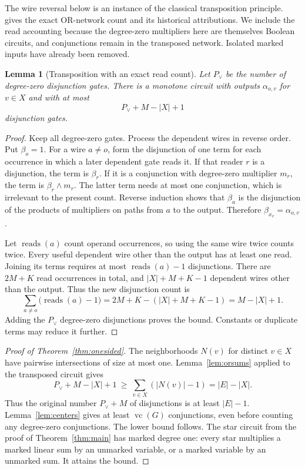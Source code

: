 \documentclass[11pt]{article}
\newcommand{\vc}{\operatorname{vc}}
\newtheorem{lemma}[theorem]{Lemma}
\theoremstyle{definition}
\theoremstyle{remark}
\begin{document}
The wire reversal below is an instance of the classical transposition principle. \citet[p.~46]{JuknaBook} gives the exact OR-network count and its historical attributions. We include the read accounting because the degree-zero multipliers here are themselves Boolean circuits, and conjunctions remain in the transposed network. Isolated marked inputs have already been removed.

\begin{lemma}[Transposition with an exact read count]\label{lem:transpose}
Let $P_\vee$ be the number of degree-zero disjunction gates. There is a monotone circuit with outputs $\alpha_{o,v}$ for $v\in X$ and with at most
\[
 P_\vee+M-|X|+1
\]
disjunction gates.
\end{lemma}
\begin{proof}
Keep all degree-zero gates. Process the dependent wires in reverse order. Put $\beta_o=1$. For a wire $a\ne o$, form the disjunction of one term for each occurrence in which a later dependent gate reads it. If that reader $r$ is a disjunction, the term is $\beta_r$. If it is a conjunction with degree-zero multiplier $m_r$, the term is $\beta_r\wedge m_r$. The latter term needs at most one conjunction, which is irrelevant to the present count. Reverse induction shows that $\beta_a$ is the disjunction of the products of multipliers on paths from $a$ to the output. Therefore $\beta_{x_v}=\alpha_{o,v}$.

Let $\operatorname{reads}(a)$ count operand occurrences, so using the same wire twice counts twice. Every useful dependent wire other than the output has at least one read. Joining its terms requires at most $\operatorname{reads}(a)-1$ disjunctions. There are $2M+K$ read occurrences in total, and $|X|+M+K-1$ dependent wires other than the output. Thus the new disjunction count is
\[
 \sum_{a\ne o}\bigl(\operatorname{reads}(a)-1\bigr)
 =2M+K-(|X|+M+K-1)=M-|X|+1.
\]
Adding the $P_\vee$ degree-zero disjunctions proves the bound. Constants or duplicate terms may reduce it further.
\end{proof}

\begin{proof}[Proof of Theorem~\ref{thm:onesided}]
The neighborhoods $N(v)$ for distinct $v\in X$ have pairwise intersections of size at most one. Lemma~\ref{lem:orsums} applied to the transposed circuit gives
\[
 P_\vee+M-|X|+1\ \ge\ \sum_{v\in X}(|N(v)|-1)
 =|E|-|X|.
\]
Thus the original number $P_\vee+M$ of disjunctions is at least $|E|-1$. Lemma~\ref{lem:centers} gives at least $\vc(G)$ conjunctions, even before counting any degree-zero conjunctions. The lower bound follows. The star circuit from the proof of Theorem~\ref{thm:main} has marked degree one: every star multiplies a marked linear sum by an unmarked variable, or a marked variable by an unmarked sum. It attains the bound.
\end{proof}
\end{document}
